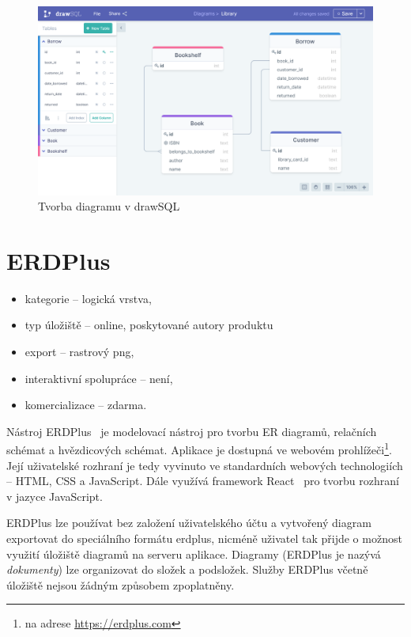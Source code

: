 \begin{figure}[!htb]
  \centering
  \includegraphics[width = \maxwidth{\textwidth}]{../img/drawsql.png}
  \caption{Tvorba diagramu v drawSQL}
  \label{fig:drawsql}
\end{figure}

\section{ERDPlus}
\begin{itemize}
  \item kategorie -- logická vrstva,
  \item typ úložiště -- online, poskytované autory produktu
  \item export -- rastrový \acrshort{png},
  \item interaktivní spolupráce -- není,
  \item komercializace -- zdarma.
\end{itemize}

Nástroj ERDPlus~\cite{erdplus_2023} je modelovací nástroj pro tvorbu ER diagramů, relačních schémat a hvězdicových schémat.
Aplikace je dostupná ve webovém prohlížeči\footnote{na adrese \url{https://erdplus.com}}.
Její uživatelské rozhraní je tedy vyvinuto ve standardních webových technologiích -- HTML, CSS a JavaScript.
Dále využívá framework React~\cite{react_2023} pro tvorbu rozhraní v jazyce JavaScript.

ERDPlus lze používat bez založení uživatelského účtu a vytvořený diagram exportovat do speciálního formátu erdplus, nicméně uživatel tak přijde o možnost využití úložiště diagramů na serveru aplikace.
Diagramy (ERDPlus je nazývá \emph{dokumenty}) lze organizovat do složek a podsložek.
Služby ERDPlus včetně úložiště nejsou žádným způsobem zpoplatněny.

